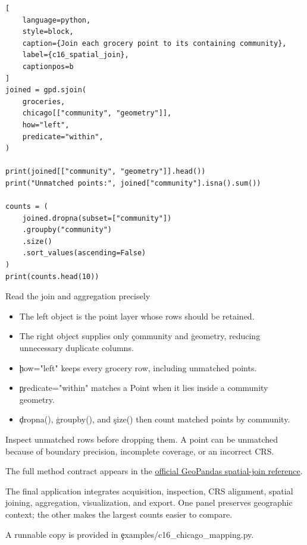 \begin{lstlisting}[
    language=python,
    style=block,
    caption={Join each grocery point to its containing community},
    label={c16_spatial_join},
    captionpos=b
]
joined = gpd.sjoin(
    groceries,
    chicago[["community", "geometry"]],
    how="left",
    predicate="within",
)

print(joined[["community", "geometry"]].head())
print("Unmatched points:", joined["community"].isna().sum())

counts = (
    joined.dropna(subset=["community"])
    .groupby("community")
    .size()
    .sort_values(ascending=False)
)
print(counts.head(10))
\end{lstlisting}

\begin{SyntaxBox}{Read the join and aggregation precisely}
\begin{itemize}
    \item The left object is the point layer whose rows should be retained.
    \item The right object supplies only \c{community} and \c{geometry}, reducing
          unnecessary duplicate columns.
    \item \c{how="left"} keeps every grocery row, including unmatched points.
    \item \c{predicate="within"} matches a Point when it lies inside a community
          geometry.
    \item \c{dropna()}, \c{groupby()}, and \c{size()} then count matched points by
          community.
\end{itemize}
Inspect unmatched rows before dropping them. A point can be unmatched because
of boundary precision, incomplete coverage, or an incorrect CRS.
\end{SyntaxBox}

The full method contract appears in the
\href{https://geopandas.org/en/stable/docs/reference/api/geopandas.sjoin.html}{official GeoPandas spatial-join reference}.

\label{sec:c16-application}

The final application integrates acquisition, inspection, CRS alignment,
spatial joining, aggregation, visualization, and export. One panel preserves
geographic context; the other makes the largest counts easier to compare.

A runnable copy is provided in \c{examples/c16_chicago_mapping.py}.


